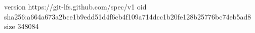 version https://git-lfs.github.com/spec/v1
oid sha256:a664a673a2bce1b9edd51d4f6cb4f109a714dcc1b20fe128b25776bc74eb5ad8
size 348084
